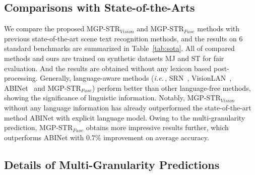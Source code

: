 \documentclass[runningheads]{llncs}
\def\ie{\emph{i.e.}\,}
\begin{document}
\subsection{Comparisons with State-of-the-Arts} 
\label{Sec:sota}
We compare the proposed MGP-STR$_{Vision}$ and MGP-STR$_{Fuse}$ methods with previous state-of-the-art scene text recognition methods, and the results on $6$ standard benchmarks  are summarized in Table~\ref{tab:sota}. All of compared methods and ours are trained on synthetic datasets MJ and ST for fair evaluation. And the results are obtained without any lexicon based post-processing. Generally, language-aware methods (\ie, SRN~\cite{SRN}, VisionLAN~\cite{vlan}, ABINet~\cite{ABInet} and MGP-STR$_{Fuse}$) perform better than other language-free methods, showing the significance of linguistic information. Notably, MGP-STR$_{Vision}$ without any language information has already outperformed the state-of-the-art method ABINet with explicit language model. Owing to the multi-granularity prediction, MGP-STR$_{Fuse}$ obtains more impressive results further, which outperforms ABINet with $0.7\%$ improvement on average accuracy. 

\subsection{Details of Multi-Granularity Predictions}  \label{Sec:fa}
\end{document}
